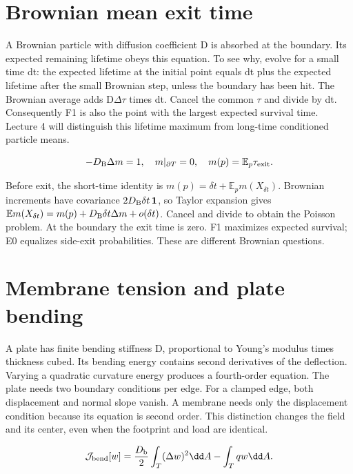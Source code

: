 \documentclass[11pt,oneside,openany]{book}
\begin{document}
\section{Brownian mean exit time}\label{sec:slide38}

A Brownian particle with diffusion coefficient D is absorbed at the boundary. Its expected remaining lifetime obeys this equation. To see why, evolve for a small time dt: the expected lifetime at the initial point equals dt plus the expected lifetime after the small Brownian step, unless the boundary has been hit. The Brownian average adds D\ensuremath{\Delta}\ensuremath{\tau} times dt. Cancel the common \ensuremath{\tau} and divide by dt. Consequently F1 is also the point with the largest expected survival time. Lecture 4 will distinguish this lifetime maximum from long-time conditioned particle means.


\[-D_{\rm B}\Delta m=1,\quad m|_{\partial T}=0,\quad m(p)=\mathbb E_p\tau_{\rm exit}.\]



Before exit, the short-time identity is
$m(p)=\delta t+\mathbb E_p m(X_{\delta t})$.
Brownian increments have covariance
$2D_{\rm B}\delta t\,\mathbf1$, so Taylor expansion gives
$\mathbb E m(X_{\delta t})=m(p)+D_{\rm B}\delta t\Delta m+o(\delta t)$.
Cancel and divide to obtain the Poisson problem.
At the boundary the exit time is zero.
F1 maximizes expected survival; E0 equalizes side-exit probabilities.
These are different Brownian questions.




\section{Membrane tension and plate bending}\label{sec:slide39}

A plate has finite bending stiffness D, proportional to Young's modulus times thickness cubed. Its bending energy contains second derivatives of the deflection. Varying a quadratic curvature energy produces a fourth-order equation. The plate needs two boundary conditions per edge. For a clamped edge, both displacement and normal slope vanish. A membrane needs only the displacement condition because its equation is second order. This distinction changes the field and its center, even when the footprint and load are identical.


\[\mathcal J_{\rm bend}[w]=\frac{D_{\rm b}}2\int_T(\Delta w)^2\dd A-\int_Tqw\dd A.\]
\end{document}
